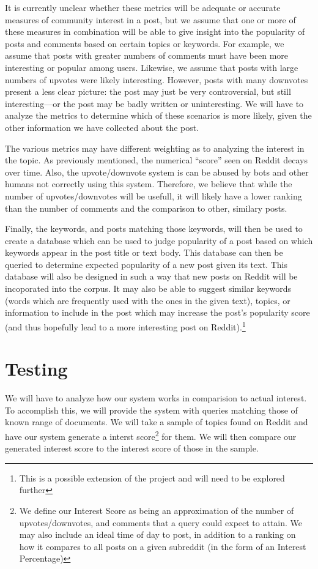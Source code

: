 \documentclass{acm_proc_article-sp}
\begin{document}
It is currently unclear whether these metrics will be adequate or accurate measures of community interest
in a post, but we assume that one or more of these measures in combination will be able to give insight
into the popularity of posts and comments based on certain topics or keywords.  For example, we assume that
posts with greater numbers of comments must have been more interesting or popular among users.  Likewise, we
assume that posts with large numbers of upvotes were likely interesting.  However, posts with many downvotes
present a less clear picture: the post may just be very controversial, but still interesting---or the post
may be badly written or uninteresting.  We will have to analyze the metrics to determine which of these
scenarios is more likely, given the other information we have collected about the post.

The various metrics may have different weighting as to analyzing the interest in the topic. As previously mentioned,
the numerical ``score'' seen on Reddit decays over time. Also, the upvote/downvote system is can be abused by bots and
other humans not correctly using this system. Therefore, we believe that while the number of upvotes/downvotes will be 
usefull, it will likely have a lower ranking than the number of comments and the comparison to other, similary posts.



Finally, the keywords, and posts matching those keywords, will then be used to create a database which
can be used to judge popularity of a post based on which keywords appear in the post title or text
body.  This database can then be queried to determine expected popularity of a new post given its
text.  This database will also be designed in such a way that new posts on Reddit will be incoporated into the corpus.
It may also be able to suggest similar keywords (words which are frequently used with
the ones in the given text), topics, or information to include in the post which may increase
the post's popularity score (and thus hopefully lead to a more interesting post on Reddit).\footnote{This is a possible extension of the project and will need to be explored further}

\section{Testing}
We will have to analyze how our system works in comparision to actual interest. To accomplish this, we will
provide the system with queries matching those of known range of documents. We will take a sample of topics found on Reddit
and have our system generate a interst score\footnote{We define our Interest Score as being an approximation of the number of
upvotes/downvotes, and comments that a query could expect to attain. We may also include an ideal time of day to post, in addition
to a ranking on how it compares to all posts on a given subreddit (in the form of an Interest Percentage)} for them. 
We will then compare our generated interest score to the interest score of those in the sample.
\end{document}
